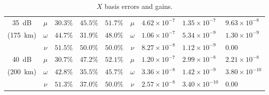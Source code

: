 \begin{table}[htbp]
\begin{tabular}{cclllclll}
        \SI{35}{dB}  & $\mu$        & $30.3\%$                  & $45.5\%$                  & $51.7\%                 $ & $\mu$        & $4.62\times10^{-7}$     & $1.35\times10^{-7}$     & $9.63\times10^{-8}$     \\
(\SI{175}{\km}) & $\omega$        & $44.7\%$                  & 31.9\%                  & $48.0\%$                  & $\omega$        & $1.06\times10^{-7}$     & $5.34\times10^{-9}$     & $1.30\times10^{-9}$\\
        & $\nu$        & $51.5\%$                  & $50.0\%$                  & $50.0\%$                  & $\nu$        & $8.27\times10^{-8}$     & $1.12\times10^{-9}$     & $0.00$     \vspace{5pt}\\
\SI{40}{dB} & $\mu$        & $30.7\%$                  & $47.2\%$                  & $52.1\%$                  & $\mu$        & $1.20\times10^{-7}$     & $2.99\times10^{-8}$     & $2.21\times10^{-8}$     \\
(\SI{200}{\km}) & $\omega$        & $42.8\%$                  & $35.5\%$                  & $45.7\%$                  & $\omega$        & $3.36\times10^{-8}$     & $1.42\times10^{-9}$     & $3.80\times10^{-10}$    \\
        & $\nu$        & $51.3\%$                  & $37.0\%$                  & $50.0\%$                  & $\nu$        & $2.57\times10^{-8}$     & $3.40\times10^{-10}$    & $0.00$                 
\end{tabular}
\caption{$X$ basis errors and gains.}
\end{table}


